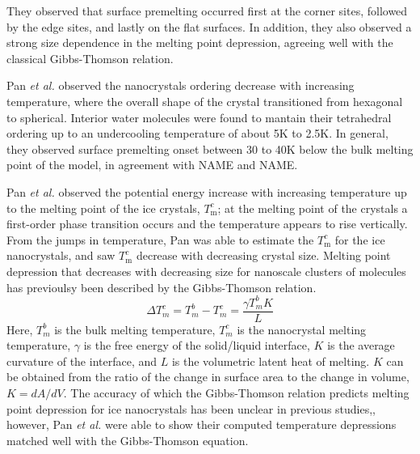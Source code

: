 They observed that surface premelting occurred first at the corner
sites, followed by the edge sites, and lastly on the flat surfaces.
In addition, they also observed a strong size dependence in the
melting point depression, agreeing well with the classical
Gibbs-Thomson relation. 

Pan \textit{et al.} observed the nanocrystals ordering decrease with
increasing temperature, where the overall shape of the crystal
transitioned from hexagonal to spherical. Interior water molecules
were found to mantain their tetrahedral ordering up to an undercooling
temperature of about 5K to 2.5K. In general, they observed surface
premelting onset between 30 to 40K below the bulk melting point of the
model, in agreement with NAME and NAME. 

Pan \textit{et al.} observed the potential energy increase with
increasing temperature up to the melting point of the ice crystals,
$T^{c}_\mathrm{m}$; at the melting point of the crystals a first-order
phase transition occurs and the temperature appears to rise
vertically. From the jumps in temperature, Pan was able to estimate
the $T^{c}_\mathrm{m}$ for the ice nanocrystals, and saw
$T^{c}_\mathrm{m}$ decrease with decreasing crystal size. Melting
point depression that decreases with decreasing size for nanoscale
clusters of molecules has previoulsy been described by the
Gibbs-Thomson relation. 
\begin{equation}\label{GibbsThomson}
\Delta T^{c}_{m} = T^{b}_{m} - T^{c}_{m} = \frac{\gamma T^{b}_{m} K}{L}
\end{equation}
Here, $T^{b}_{m}$ is the bulk melting temperature, $T^{c}_{m}$ is the
nanocrystal melting temperature, $\gamma$ is the free energy of the
solid/liquid interface, $K$ is the average curvature of the interface,
and $L$ is the volumetric latent heat of melting. $K$ can be obtained
from the ratio of the change in surface area to the change in volume,
$K = dA/dV$. The accuracy of which the Gibbs-Thomson relation predicts
melting point depression for ice nanocrystals has been unclear in
previous studies,\cite{Makkonen2000,Makkonen2002,Della2002,Campbell2002},
however, Pan \textit{et al.} were able to show their computed
temperature depressions matched well with the Gibbs-Thomson equation.

